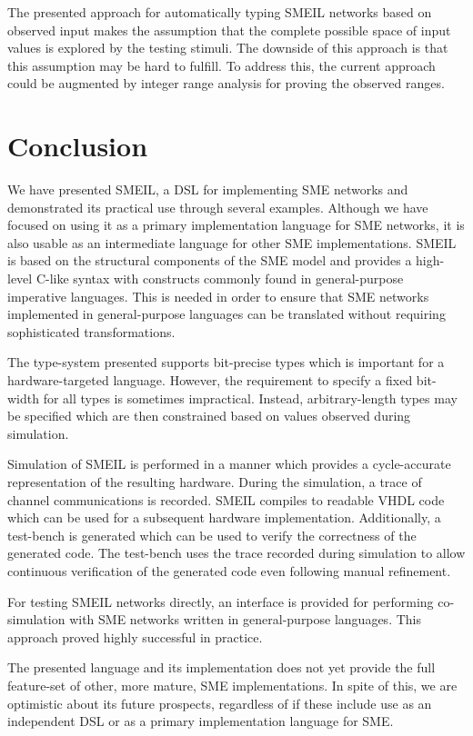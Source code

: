 The presented approach for automatically typing SMEIL networks based on observed
input makes the assumption that the complete possible space of input values is
explored by the testing stimuli. The downside of this approach is that this
assumption may be hard to fulfill. To address this, the current approach could
be augmented by integer range analysis for proving the observed ranges.


\section*{Conclusion}
We have presented SMEIL, a DSL for implementing SME networks and demonstrated
its practical use through several examples. Although we have focused on using it
as a primary implementation language for SME networks, it is also usable as an
intermediate language for other SME implementations. SMEIL is based on the
structural components of the SME model and provides a high-level C-like syntax
with constructs commonly found in general-purpose imperative languages. This is
needed in order to ensure that SME networks implemented in general-purpose
languages can be translated without requiring sophisticated transformations.

The type-system presented supports bit-precise types which is important for a
hardware-targeted language. However, the requirement to specify a fixed
bit-width for all types is sometimes impractical. Instead, arbitrary-length
types may be specified which are then constrained based on values observed
during simulation.

Simulation of SMEIL is performed in a manner which provides a cycle-accurate
representation of the resulting hardware. During the simulation, a trace of
channel communications is recorded. SMEIL compiles to readable VHDL code which
can be used for a subsequent hardware implementation. Additionally, a test-bench
is generated which can be used to verify the correctness of the generated
code. The test-bench uses the trace recorded during simulation to allow
continuous verification of the generated code even following manual refinement.

For testing SMEIL networks directly, an interface is provided for performing
co-simulation with SME networks written in general-purpose languages. This
approach proved highly successful in practice.

The presented language and its implementation does not yet provide the full
feature-set of other, more mature, SME implementations. In spite of this, we are
optimistic about its future prospects, regardless of if these include use as an
independent DSL or as a primary implementation language for SME.

